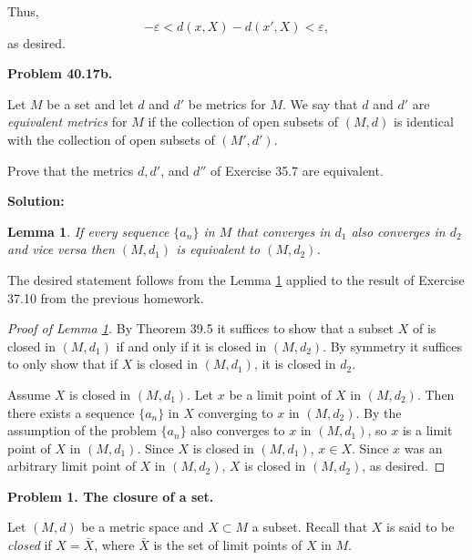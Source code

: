 \documentclass[12pt]{article}
\def\black{\color{black}}
\def\green{\color{rltgreen}}
\newtheorem{lemma}{Lemma}
\renewcommand\|{\ | \ }
\def\pb#1{{\green \bf Problem #1.}\hskip 8pt \black}
\def\sol{\textbf{Solution:}}
\def\sequence#1{$\{{#1}_n\}$}
\newcommand\e\varepsilon
\begin{document}
Thus, 
\[
-\e < d(x, X) - d(x', X) < \e,
\]
as desired.


\pb{40.17b}

Let $M$ be a set and let $d$ and $d'$ be metrics for $M$. We say that $d$
and $d'$ are \emph{equivalent metrics} for $M$ if the collection of open
subsets of $(M, d)$ is identical with the collection of open subsets of
$(M', d')$.

Prove that the metrics $d, d'$, and $d''$ of Exercise 35.7 are equivalent.

\sol

\begin{lemma}
\label{lem:equivalent-metrics}
If every sequence \sequence a in $M$ that converges in $d_1$ also converges
in $d_2$ and vice versa then $(M, d_1)$ is equivalent to $(M, d_2)$.
\end{lemma}

The desired statement follows from the Lemma \ref{lem:equivalent-metrics}
applied to the result of Exercise 37.10 from the previous homework.

\begin{proof}[Proof of Lemma \ref{lem:equivalent-metrics}]
By Theorem 39.5 it suffices to show that a subset $X$ of is closed in 
$(M, d_1)$ if and only if it is closed in $(M, d_2)$. By symmetry
it suffices to only show that if $X$ is closed in $(M, d_1)$, it is
closed in $d_2$.

Assume $X$ is closed in $(M, d_1)$. Let $x$ be a limit point of $X$ in
$(M, d_2)$. Then there exists a sequence \sequence a in $X$ converging
to $x$ in $(M, d_2)$. By the assumption of the problem \sequence a
also converges to $x$ in $(M, d_1)$, so $x$ is a limit point of $X$
in $(M, d_1)$. Since $X$ is closed in $(M, d_1)$, $x \in X$. Since
$x$ was an arbitrary limit point of $X$ in $(M, d_2)$, $X$ is closed
in $(M, d_2)$, as desired.
\end{proof}



\pb{1. The closure of a set}

Let $(M, d)$ be a metric space and $X \subset M$ a subset.
Recall that $X$ is said to be \emph{closed} if $X = \bar X$, where $\bar X$ 
is the set of limit points of $X$ in $M$.
\end{document}
